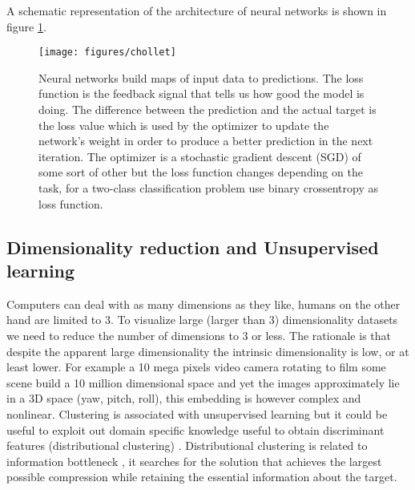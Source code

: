 \documentclass[11pt]{article}
\theoremstyle{definition}
\theoremstyle{remark}
\begin{document}
A schematic representation of the architecture of neural networks is shown in figure \ref{fig:cholletfig}.

\begin{figure}[H]
        \centering
        \texttt{[image: figures/chollet]}
        \caption{Neural networks build maps of input data to predictions. The loss function is the feedback signal that tells us how good the model is doing. The difference between the prediction and the actual target is the loss value which is used by the optimizer to update the network's weight in order to produce a better prediction in the next iteration. The optimizer is a stochastic gradient descent (SGD) of some sort of other but the loss function changes depending on the task, for a two-class classification problem use binary crossentropy as loss function. 
        } \label{fig:cholletfig}
\end{figure}


\subsection{Dimensionality reduction and Unsupervised learning}

Computers can deal with as many dimensions as they like, humans on the other hand are limited to 3. To visualize large (larger than 3) dimensionality datasets we need to reduce the number of dimensions to 3 or less. The rationale is that despite the apparent large dimensionality the intrinsic dimensionality is low, or at least lower. For example a 10 mega pixels video camera rotating to film some scene build a 10 million dimensional space and yet the images approximately lie in a 3D space (yaw, pitch, roll), this embedding is however complex and nonlinear.
Clustering is associated with unsupervised learning but it could be useful to exploit out domain specific knowledge useful to obtain  discriminant features (distributional clustering) \cite{guyon2003introduction}. Distributional clustering is related to information bottleneck \cite{tishby2015deep}, it searches for the solution that achieves the largest possible compression while retaining the essential information about the target.
\end{document}
